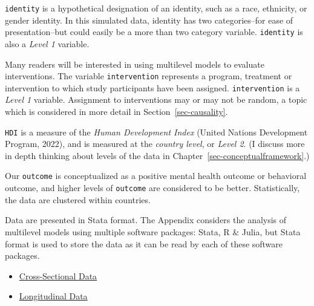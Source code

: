 \documentclass[
  letterpaper,
  DIV=11,
  numbers=noendperiod]{scrreprt}
\providecommand{\tightlist}{%
  \setlength{\itemsep}{0pt}\setlength{\parskip}{0pt}}\usepackage{longtable,booktabs,array}
\begin{document}
\texttt{identity} is a hypothetical designation of an identity, such as
a race, ethnicity, or gender identity. In this simulated data, identity
has two categories--for ease of presentation--but could easily be a more
than two category variable. \texttt{identity} is also a \emph{Level 1}
variable.

Many readers will be interested in using multilevel models to evaluate
interventions. The variable \texttt{intervention} represents a program,
treatment or intervention to which study participants have been
assigned. \texttt{intervention} is a \emph{Level 1} variable. Assignment
to interventions may or may not be random, a topic which is considered
in more detail in Section~\ref{sec-causality}.

\texttt{HDI} is a measure of the \emph{Human Development Index} (United
Nations Development Program, 2022), and is measured at the \emph{country
level}, or \emph{Level 2}. (I discuss more in depth thinking about
levels of the data in Chapter~\ref{sec-conceptualframework}.)

Our \texttt{outcome} is conceptualized as a positive mental health
outcome or behavioral outcome, and higher levels of \texttt{outcome} are
considered to be better. Statistically, the data are clustered within
countries.

\begin{tcolorbox}[enhanced jigsaw, bottomtitle=1mm, breakable, bottomrule=.15mm, colbacktitle=quarto-callout-note-color!10!white, opacityback=0, colback=white, arc=.35mm, coltitle=black, rightrule=.15mm, leftrule=.75mm, titlerule=0mm, toprule=.15mm, colframe=quarto-callout-note-color-frame, toptitle=1mm, title=\textcolor{quarto-callout-note-color}{\faInfo}\hspace{0.5em}{Download The Data}, left=2mm, opacitybacktitle=0.6]

Data are presented in Stata format. The Appendix considers the analysis
of multilevel models using multiple software packages: Stata, R \&
Julia, but Stata format is used to store the data as it can be read by
each of these software packages.

\begin{itemize}
\tightlist
\item
  \href{https://github.com/agrogan1/multilevel-thinking/raw/main/simulate-and-analyze-multilevel-data/simulated_multilevel_data.dta}{Cross-Sectional
  Data}
\item
  \href{https://github.com/agrogan1/multilevel-thinking/raw/main/simulate-and-analyze-multilevel-data/simulated_multilevel_longitudinal_data.dta}{Longitudinal
  Data}
\end{itemize}

\end{tcolorbox}
\end{document}

